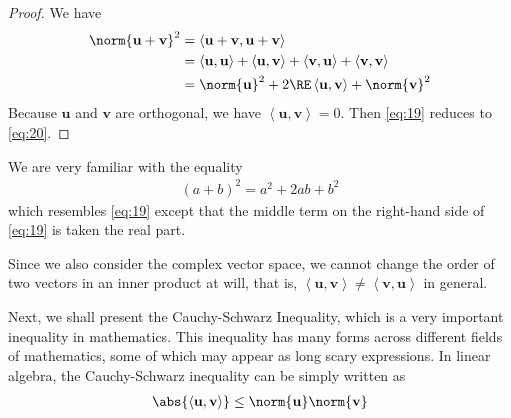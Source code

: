 \documentclass[thmcnt=section, color=blue, 12pt]{my-elegantbook}
\begin{document}
\begin{proof}
    We have 
    \begin{align}
        \norm{\mathbf{u} + \mathbf{v}}^2
        &= \left\langle \mathbf{u} + \mathbf{v}, \mathbf{u} + \mathbf{v} \right\rangle \nonumber \\ 
        &= \left\langle \mathbf{u}, \mathbf{u} \right\rangle
        + \left\langle \mathbf{u}, \mathbf{v} \right\rangle
        + \left\langle \mathbf{v}, \mathbf{u} \right\rangle
        + \left\langle \mathbf{v}, \mathbf{v} \right\rangle \nonumber \\ 
        &= \norm{\mathbf{u}}^2
        + 2 \RE \left\langle \mathbf{u}, \mathbf{v} \right\rangle
        + \norm{\mathbf{v}}^2
        \label{eq:19}
    \end{align}
    Because $\mathbf{u}$ and $\mathbf{v}$ are orthogonal, we have $\left\langle \mathbf{u}, \mathbf{v} \right\rangle = 0$. Then \eqref{eq:19} reduces to \eqref{eq:20}.
\end{proof}

\begin{note}
    We are very familiar with the equality
    \begin{align*}
        (a + b)^2 = a^2 + 2ab + b^2
    \end{align*}
    which resembles \eqref{eq:19} except that the middle term on the right-hand side of \eqref{eq:19} is taken the real part.

    \par Since we also consider the complex vector space, we cannot change the order of two vectors in an inner product at will, that is, $\left\langle \mathbf{u}, \mathbf{v} \right\rangle \neq \left\langle \mathbf{v}, \mathbf{u} \right\rangle$ in general.
\end{note}


\par Next, we shall present the Cauchy-Schwarz Inequality, which is a very important inequality in mathematics. This inequality has many forms across different fields of mathematics, some of which may appear as long scary expressions. In linear algebra, the Cauchy-Schwarz inequality can be simply written as 
\begin{align*}
    \abs{\left\langle \mathbf{u}, \mathbf{v} \right\rangle}
    \leq \norm{\mathbf{u}} \norm{\mathbf{v}}
\end{align*}
\end{document}
